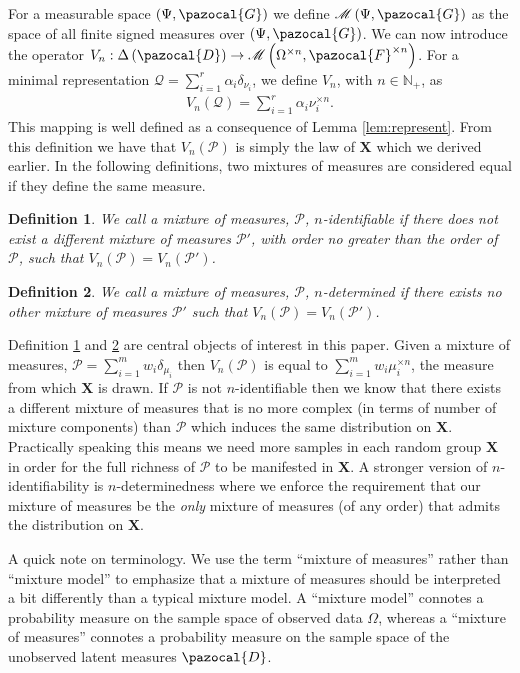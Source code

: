 \documentclass[aos,preprint]{imsart}
\def\nn{\mathbb{N}}
\def\sF{\pazocal{F}}
\def\sG{\pazocal{G}}
\def\sM{\pazocal{M}}
\def\sD{\pazocal{D}}
\def\sP{\mathscr{P}}
\def\sM{\mathscr{M}}
\def\sQ{\mathscr{Q}}
\def\bX{\mathbf{X}}
\def\dd{\Delta\left( \sD \right)}
\theoremstyle{plain}
\theoremstyle{defintion}
\newtheorem{defin}{Definition}[section]
\begin{document}
	
	For a measurable space $\left(\Psi, \sG \right)$ we define $\sM \left(\Psi, \sG \right)$ as the space of all finite signed measures over $\left(\Psi, \sG \right)$. We can now introduce the operator $V_n:\dd\to \sM\left( \Omega^{\times n}, \sF^{\times n} \right)$. For a minimal representation $\sQ =\sum_{i=1}^r  \alpha_i\delta_{\nu_i}$, we define $V_n$, with $n \in \nn_+$, as 
	\begin{eqnarray*}
		V_n(\sQ) =\sum_{i=1}^r  \alpha_i\nu_i^{\times n}.
	\end{eqnarray*}
	This mapping is well defined as a consequence of Lemma \ref{lem:represent}.
	From this definition we have that $V_n\left( \sP \right)$ is simply the law of $\bX$ which we derived earlier. In the following definitions, two mixtures of measures are considered equal if they define the same measure.

	\begin{defin}\label{def:ident}
		We call a mixture of measures, $\sP$, \emph{$n$-identifiable} if there does not exist a different mixture of measures $\sP'$, with order no greater than the order of $\sP$, such that $V_n\left( \sP \right) = V_n\left( \sP' \right)$.
	\end{defin}
	\begin{defin}\label{def:det}
		We call a mixture of measures, $\sP$, \emph{$n$-determined} if there exists no other mixture of measures $\sP'$ such that $V_n\left( \sP \right) = V_n\left( \sP' \right)$. 
	\end{defin}

	Definition \ref{def:ident} and \ref{def:det} are central objects of interest in this paper. Given a mixture of measures, $\sP = \sum_{i=1}^m w_i\delta_{\mu_i}$ then $V_n(\sP)$ is equal to $\sum_{i=1}^m w_i \mu_i^{\times n}$, the measure from which $\bX$ is drawn. If $\sP$ is not $n$-identifiable then we know that there exists a different mixture of measures that is no more complex (in terms of number of mixture components) than $\sP$ which induces the same distribution on $\bX$. Practically speaking this means we need more samples in each random group $\bX$ in order for the full richness of $\sP$ to be manifested in $\bX$. A stronger version of $n$-identifiability is $n$-determinedness where we enforce the requirement that our mixture of measures be the {\em only} mixture of measures (of any order) that admits the distribution on $\bX$.
	
	A quick note on terminology. We use the term ``mixture of measures'' rather than ``mixture model'' to emphasize that a mixture of measures should be interpreted a bit differently than a typical mixture model. A ``mixture model'' connotes a probability measure on the sample space of observed data $\Omega$, whereas a ``mixture of measures'' connotes a probability measure on the sample space of the unobserved latent measures $\sD$.
\end{document}
